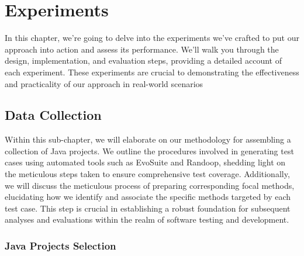 \chapter{Experiments}
\label{cha:experiments}
\vspace{0.4 cm}

In this chapter, we're going to delve into the experiments we've crafted to put our approach into action and assess its performance. We'll walk you through the design, implementation, and evaluation steps, providing a detailed account of each experiment. These experiments are crucial to demonstrating the effectiveness and practicality of our approach in real-world scenarios

\section{Data Collection}
\label{sec:data_collection}
\vspace{0.2 cm}
Within this sub-chapter, we will elaborate on our methodology for assembling a collection of Java projects. We outline the procedures involved in generating test cases using automated tools such as EvoSuite and Randoop\cite{noauthor_randoop_nodate}, shedding light on the meticulous steps taken to ensure comprehensive test coverage. Additionally, we will discuss the meticulous process of preparing corresponding focal methods, elucidating how we identify and associate the specific methods targeted by each test case. This step is crucial in establishing a robust foundation for subsequent analyses and evaluations within the realm of software testing and development.

\vspace{0.1 cm}
\subsection{Java Projects Selection}
\label{sec:projects_selection}
\vspace{0.1 cm}

